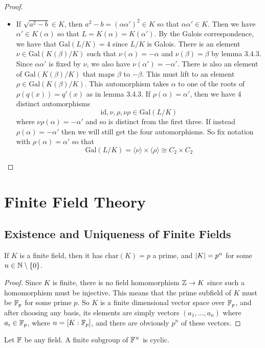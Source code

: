\documentclass[a4paper]{article}
\begin{document}
\begin{thm}{}{}
\begin{proof}
\begin{itemize}
\item If $\sqrt{a^2-b}\in K$, then $a^2-b=(\alpha\alpha')^2\in K$ so that $\alpha\alpha'\in K$. Then we have $\alpha'\in K(\alpha)$ so that $L=K(\alpha)=K(\alpha')$. By the Galois correspondence, we have that $\text{Gal}(L/K)=4$ since $L/K$ is Galois. There is an element $\nu\in\text{Gal}(K(\beta)/K)$ such that $\nu(\alpha)=-\alpha$ and $\nu(\beta)=\beta$ by lemma 3.4.3. Since $\alpha\alpha'$ is fixed by $\nu$, we also have $\nu(\alpha')=-\alpha'$. There is also an element of $\text{Gal}(K(\beta)/K)$ that maps $\beta$ to $-\beta$. This must lift to an element $\rho\in\text{Gal}(K(\beta)/K)$. This automorphism takes $\alpha$ to one of the roots of $\rho(q(x))=q'(x)$ as in lemma 3.4.3.  If $\rho(\alpha)=\alpha'$, then we have $4$ distinct automorphisms $$\text{id},\nu,\rho,\nu\rho\in\text{Gal}(L/K)$$ where $\nu\rho(\alpha)=-\alpha'$ and so is distinct from the first three. If instead $\rho(\alpha)=-\alpha'$ then we will still get the four automorphisms. So fix notation with $\rho(\alpha)=\alpha'$ so that $$\text{Gal}(L/K)=\langle\nu\rangle\times\langle\rho\rangle\cong C_2\times C_2$$
\end{itemize}
\end{proof}
\end{thm}

\pagebreak
\section{Finite Field Theory}
\subsection{Existence and Uniqueness of Finite Fields}
\begin{prp}{}{} If $K$ is a finite field, then it has $\text{char}(K)=p$ a prime, and $\abs{K}=p^n$ for some $n\in\mathbb{N}\setminus\{0\}$. 
\begin{proof}
Since $K$ is finite, there is no field homomorphism $\mathbb{Z}\to K$ since such a homomorphism must be injective. This means that the prime subfield of $K$ must be $\mathbb{F}_p$ for some prime $p$. So $K$ is a finite dimensional vector space over $\mathbb{F}_p$, and after choosing any basis, its elements are simply vectors $(a_1,\dots,a_n)$ where $a_i\in\mathbb{F}_p$, where $n=[K:\mathbb{F}_p]$, and there are obviously $p^n$ of these vectors. 
\end{proof}
\end{prp}

\begin{lmm}{}{} Let $\mathbb{F}$ be any field. A finite subgroup of $\mathbb{F}^\times$ is cyclic. 
\end{lmm}
\end{document}
